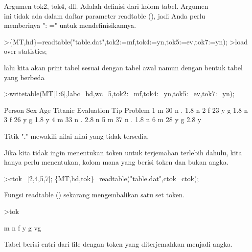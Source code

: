 \documentclass[a4paper,10pt]{article}
\begin{document}
\begin{eulernotebook}
\begin{eulercomment}
\begin{eulercomment}
\begin{eulercomment}
\begin{eulercomment}
\begin{eulercomment}
\begin{eulercomment}
\begin{eulercomment}
\begin{eulercomment}
\begin{eulercomment}
Argumen tok2, tok4, dll. Adalah definisi dari kolom tabel. Argumen\\
ini tidak ada dalam daftar parameter readtable (), jadi Anda perlu\\
memberinya ": =" untuk mendefinisikannya.
\end{eulercomment}
\begin{eulerprompt}
>\{MT,hd\}=readtable("table.dat",tok2:=mf,tok4:=yn,tok5:=ev,tok7:=yn);
>load over statistics;
\end{eulerprompt}
\begin{eulercomment}
lalu kita akan print tabel sesuai dengan tabel awal namun dengan
bentuk tabel yang berbeda
\end{eulercomment}
\begin{eulerprompt}
>writetable(MT[1:6],labc=hd,wc=5,tok2:=mf,tok4:=yn,tok5:=ev,tok7:=yn);
\end{eulerprompt}
\begin{euleroutput}
   Person  Sex  Age Titanic Evaluation  Tip Problem
        1    m   30       n          .  1.8       n
        2    f   23       y          g  1.8       n
        3    f   26       y          g  1.8       y
        4    m   33       n          .  2.8       n
        5    m   37       n          .  1.8       n
        6    m   28       y          g  2.8       y
\end{euleroutput}
\begin{eulercomment}
Titik "." mewakili nilai-nilai yang tidak tersedia.

Jika kita tidak ingin menentukan token untuk terjemahan terlebih
dahulu, kita hanya perlu menentukan, kolom mana yang berisi token dan
bukan angka.
\end{eulercomment}
\begin{eulerprompt}
>ctok=[2,4,5,7]; \{MT,hd,tok\}=readtable("table.dat",ctok=ctok);  
\end{eulerprompt}
\begin{eulercomment}
Fungsi readtable () sekarang mengembalikan satu set token.
\end{eulercomment}
\begin{eulerprompt}
>tok
\end{eulerprompt}
\begin{euleroutput}
  m
  n
  f
  y
  g
  vg
\end{euleroutput}
\begin{eulercomment}
Tabel berisi entri dari file dengan token yang diterjemahkan menjadi
angka.


\end{eulercomment}
\end{eulercomment}
\end{eulercomment}
\end{eulercomment}
\end{eulercomment}
\end{eulercomment}
\end{eulercomment}
\end{eulercomment}
\end{eulercomment}
\end{eulernotebook}
\end{document}
